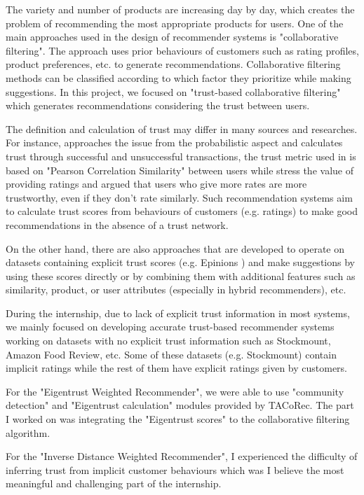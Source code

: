 The variety and number of products are increasing day by day, which creates the problem of recommending the most appropriate products for users. One of the main approaches used in the design of recommender systems is "collaborative filtering". The approach uses prior behaviours of customers such as rating profiles, product preferences, etc. to generate recommendations. Collaborative filtering methods can be classified according to which factor they prioritize while making suggestions. In this project, we focused on "trust-based collaborative filtering" which generates recommendations considering the trust between users. 

The definition and calculation of trust may differ in many sources and researches. For instance, \cite{Eigentrust} approaches the issue from the probabilistic aspect and calculates trust through successful and unsuccessful transactions, the trust metric used in \cite{papagelis_article} is based on "Pearson Correlation Similarity" between users while \cite{lathia_article} stress the value of providing ratings and argued that users who give more rates are more trustworthy, even if they don't rate similarly. Such recommendation systems aim to calculate trust scores from behaviours of customers (e.g. ratings) to make good recommendations in the absence of a trust network.

On the other hand, there are also approaches\cite{massa_article} that are developed to operate on datasets containing explicit trust scores (e.g. Epinions \cite{Epinions}) and make suggestions by using these scores directly or by combining them with additional features such as similarity, product, or user attributes (especially in hybrid recommenders), etc. 

During the internship, due to lack of explicit trust information in most systems, we mainly focused on developing accurate trust-based recommender systems working on datasets with no explicit trust information such as Stockmount, Amazon Food Review, etc. Some of these datasets (e.g. Stockmount) contain implicit ratings while the rest of them have explicit ratings given by customers.

For the "Eigentrust Weighted Recommender", we were able to use "community detection" and "Eigentrust calculation" modules provided by TACoRec. The part I worked on was integrating the "Eigentrust scores" to the collaborative filtering algorithm. 

For the "Inverse Distance Weighted Recommender", I experienced the difficulty of inferring trust from implicit customer behaviours which was I believe the most meaningful and challenging part of the internship.
